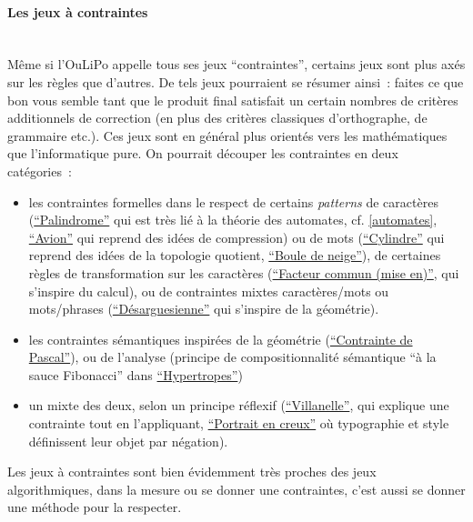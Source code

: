 \documentclass{article}
\newcommand{\subsubsubsection}[1]{\paragraph{#1}\mbox{}\\}
\begin{document}
				
				\subsubsubsection{Les jeux à contraintes}
					Même si l'OuLiPo appelle tous ses jeux ``contraintes'', certains jeux sont plus axés sur les règles que d'autres. De tels jeux pourraient se résumer ainsi~: faites ce que bon vous semble tant que le produit final satisfait un certain nombres de critères additionnels de correction (en plus des critères classiques d'orthographe, de grammaire etc.). Ces jeux sont en général plus orientés vers les mathématiques que l'informatique pure. On pourrait découper les contraintes en deux catégories~:
					\begin{itemize}
						\item les contraintes formelles dans le respect de certains \textit{patterns} de caractères (\href{http://oulipo.net/fr/contraintes/palindrome}{``Palindrome''} qui est très lié à la théorie des automates, cf. \ref{automates}, \href{http://oulipo.net/fr/contraintes/avion}{``Avion''} qui reprend des idées de compression) ou de mots (\href{http://oulipo.net/fr/contraintes/cylindre}{``Cylindre''} qui reprend des idées de la topologie quotient, \href{http://oulipo.net/fr/contraintes/cylindre}{``Boule de neige''}), de certaines règles de transformation sur les caractères (\href{http://oulipo.net/fr/contraintes/facteur-commun-mise-en}{``Facteur commun (mise en)''}, qui s'inspire du calcul), 	ou de contraintes mixtes caractères/mots ou mots/phrases (\href{http://oulipo.net/fr/contraintes/desarguesienne}{``Désarguesienne''} qui s'inspire de la géométrie).
						\item les contraintes sémantiques inspirées de la géométrie (\href{http://oulipo.net/fr/contraintes/contrainte-de-pascal}{``Contrainte de Pascal''}), ou de l'analyse (principe de compositionnalité sémantique ``à la sauce Fibonacci'' dans \href{http://oulipo.net/fr/contraintes/hypertropes}{``Hypertropes''})
						\item un mixte des deux, selon un principe réflexif (\href{http://oulipo.net/fr/contraintes/villanelle}{``Villanelle''}, qui explique une contrainte tout en l'appliquant, \href{http://oulipo.net/fr/contraintes/portrait-en-creux}{``Portrait en creux''} où typographie et style définissent leur objet par négation).
					\end{itemize}
					Les jeux à contraintes sont bien évidemment très proches des jeux algorithmiques, dans la mesure ou se donner une contraintes, c'est aussi se donner une méthode pour la respecter. 
				
\end{document}
